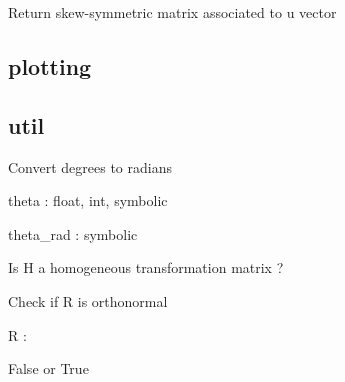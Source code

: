 \documentclass[letterpaper,10pt,english]{sphinxmanual}
\begin{document}

\begin{fulllineitems}
\label{\detokenize{_src/didactic:rkd.didactic.transformations.skew}}
Return skew-symmetric matrix associated to u vector

\end{fulllineitems}



\subsection{plotting}
\label{\detokenize{_src/didactic:plotting}}\label{\detokenize{_src/didactic:module-rkd.didactic.plotting}}

\subsection{util}
\label{\detokenize{_src/didactic:util}}\label{\detokenize{_src/didactic:module-rkd.didactic.util}}

\begin{fulllineitems}
\label{\detokenize{_src/didactic:rkd.didactic.util.deg2rad}}
Convert degrees to radians

theta : float, int, symbolic

theta\_rad : symbolic

\end{fulllineitems}


\begin{fulllineitems}
\label{\detokenize{_src/didactic:rkd.didactic.util.ishtm}}
Is H a homogeneous transformation matrix ?

\end{fulllineitems}


\begin{fulllineitems}
\label{\detokenize{_src/didactic:rkd.didactic.util.isorthonormal}}
Check if R is orthonormal

R : 

False or True

\end{fulllineitems}
\end{document}
